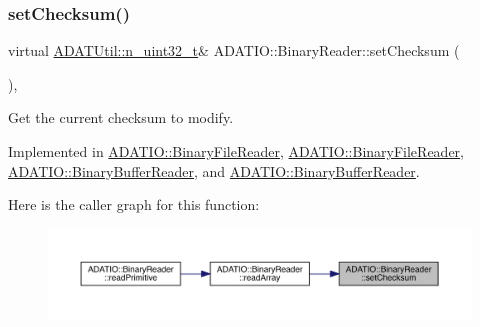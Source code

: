 \mbox{\label{classADATIO_1_1BinaryReader_a33d291f073bf2e1f71f6bdbe40ce343a}} 
\subsubsection{\texorpdfstring{setChecksum()}{setChecksum()}\hspace{0.1cm}{\footnotesize\ttfamily [1/2]}}
{\footnotesize\ttfamily virtual \mbox{\hyperlink{namespaceADATUtil_ad945a8afa4db2d1f89b731964adae97e}{A\+D\+A\+T\+Util\+::n\+\_\+uint32\+\_\+t}}\& A\+D\+A\+T\+I\+O\+::\+Binary\+Reader\+::set\+Checksum (\begin{DoxyParamCaption}{ }\end{DoxyParamCaption})\hspace{0.3cm}{\ttfamily [protected]}, {}}



Get the current checksum to modify. 



Implemented in \mbox{\hyperlink{classADATIO_1_1BinaryFileReader_a9279d31577b7fffa174df067c72ebcc4}{A\+D\+A\+T\+I\+O\+::\+Binary\+File\+Reader}}, \mbox{\hyperlink{classADATIO_1_1BinaryFileReader_a9279d31577b7fffa174df067c72ebcc4}{A\+D\+A\+T\+I\+O\+::\+Binary\+File\+Reader}}, \mbox{\hyperlink{classADATIO_1_1BinaryBufferReader_a3976e5ece3392d04158307f864a84bb7}{A\+D\+A\+T\+I\+O\+::\+Binary\+Buffer\+Reader}}, and \mbox{\hyperlink{classADATIO_1_1BinaryBufferReader_a3976e5ece3392d04158307f864a84bb7}{A\+D\+A\+T\+I\+O\+::\+Binary\+Buffer\+Reader}}.

Here is the caller graph for this function\+:\nopagebreak
\begin{figure}[H]
\begin{center}
\leavevmode
\includegraphics[width=350pt]{da/dd9/classADATIO_1_1BinaryReader_a33d291f073bf2e1f71f6bdbe40ce343a_icgraph}
\end{center}
\end{figure}
\mbox{\label{classADATIO_1_1BinaryReader_a33d291f073bf2e1f71f6bdbe40ce343a}} 
